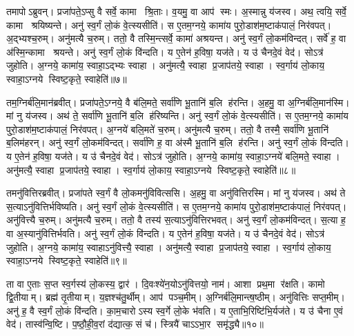    तमापोऽब्रुवन्।
   प्रजा॑पते॒ऽप्सु वै सर्वे॒ कामा श्रि॒ताः।
   व॒यमु॒ वा आप॑ स्मः।
   अ॒स्मान्नु य॑जस्व।
   अथ॒ त्वयि॒ सर्वे॒ कामा श्रयिष्यन्ते।
   अनु॑ स्व॒र्गं लो॒कं वे॒त्स्यसीति॑।
   स ए॒तम॒ग्नये॒ कामा॑य पुरो॒डाश॑म॒ष्टाक॑पालं॒ निर॑वपत्।
   अ॒द्भ्यश्च॒रुम्।
   अनु॑मत्यै च॒रुम्।
   ततो॒ वै तस्मि॒न्त्सर्वे॒ कामा॑ अश्रयन्त।
   अनु॑ स्व॒र्गं लो॒कम॑विन्दत्।
   सर्वे॑ ह॒ वा अ॑स्मि॒न्कामा श्रयन्ते।
   अनु॑ स्व॒र्गं लो॒कं वि॑न्दति।
   य ए॒तेन॑ ह॒विषा॒ यज॑ते।
   य उ॑ चैनदे॒वं वेद॑।
   सोऽत्र॑ जुहोति।
   अ॒ग्नये॒ कामा॑य॒ स्वाहा॒ऽद्भ्यः स्वाहा।
   अनु॑मत्यै॒ स्वाहा प्र॒जाप॑तये॒ स्वाहा।
   स्व॒र्गाय॑ लो॒काय॒ स्वाहा॒ऽग्नये स्विष्ट॒कृते॒ स्वाहेति॑॥७॥

   तम॒ग्निर्ब॑लि॒मान॑ब्रवीत्।
   प्रजा॑पते॒ऽग्नये॒ वै ब॑लि॒मते॒ सर्वा॑णि भू॒तानि॑ ब॒लि ह॑रन्ति।
   अ॒हमु॒ वा अ॒ग्निर्ब॑लि॒मान॑स्मि।
   मां नु य॑जस्व।
   अथ॑ ते॒ सर्वा॑णि भू॒तानि॑ ब॒लि ह॑रिष्यन्ति।
   अनु॑ स्व॒र्गं लो॒कं वे॒त्स्यसीति॑।
   स ए॒तम॒ग्नये॒ कामा॑य पुरो॒डाश॑म॒ष्टाक॑पालं॒ निर॑वपत्।
   अ॒ग्नये॑ बलि॒मते॑ च॒रुम्।
   अनु॑मत्यै च॒रुम्।
   ततो॒ वै तस्मै॒ सर्वा॑णि भू॒तानि॑ ब॒लिम॑हरन्।
   अनु॑ स्व॒र्गं लो॒कम॑विन्दत्।
   सर्वा॑णि ह॒ वा अ॑स्मै भू॒तानि॑ ब॒लि ह॑रन्ति।
   अनु॑ स्व॒र्गं लो॒कं वि॑न्दति।
   य ए॒तेन॑ ह॒विषा॒ यज॑ते।
   य उ॑ चैनदे॒वं वेद॑।
   सोऽत्र॑ जुहोति।
   अ॒ग्नये॒ कामा॑य॒ स्वाहा॒ऽग्नये॑ बलि॒मते॒ स्वाहा।
   अनु॑मत्यै॒ स्वाहा प्र॒जाप॑तये॒ स्वाहा।
   स्व॒र्गाय॑ लो॒काय॒ स्वाहा॒ऽग्नये स्विष्ट॒कृते॒ स्वाहेति॑॥८॥

   तमनु॑वित्तिरब्रवीत्।
   प्रजा॑पते स्व॒र्गं वै लो॒कमनु॑विवित्ससि।
   अ॒हमु॒ वा अनु॑वित्तिरस्मि।
   मां नु य॑जस्व।
   अथ॑ ते स॒त्याऽनु॑वित्तिर्भविष्यति।
   अनु॑ स्व॒र्गं लो॒कं वे॒त्स्यसीति॑।
   स ए॒तम॒ग्नये॒ कामा॑य पुरो॒डाश॑म॒ष्टाक॑पालं॒ निर॑वपत्।
   अनु॑वित्त्यै च॒रुम्।
   अनु॑मत्यै च॒रुम्।
   ततो॒ वै तस्य॑ स॒त्याऽनु॑वित्तिरभवत्।
   अनु॑ स्व॒र्गं लो॒कम॑विन्दत्।
   स॒त्या ह॒ वा अ॒स्यानु॑वित्तिर्भवति।
   अनु॑ स्व॒र्गं लो॒कं वि॑न्दति।
   य ए॒तेन॑ ह॒विषा॒ यज॑ते।
   य उ॑ चैनदे॒वं वेद॑।
   सोऽत्र॑ जुहोति।
   अ॒ग्नये॒ कामा॑य॒ स्वाहाऽनु॑वित्त्यै॒ स्वाहा।
   अनु॑मत्यै॒ स्वाहा प्र॒जाप॑तये॒ स्वाहा।
   स्व॒र्गाय॑ लो॒काय॒ स्वाहा॒ऽग्नये स्विष्ट॒कृते॒ स्वाहेति॑॥९॥

   ता वा ए॒ताः स॒प्त स्व॒र्गस्य॑ लो॒कस्य॒ द्वार॑।
   दि॒वःश्ये॑न॒योऽनु॑\-वित्तयो॒ नाम॑।
   आशा प्रथ॒मा र॑क्षति।
   कामो द्वि॒तीयाम्।
   ब्रह्म॑ तृ॒तीयाम्।
   य॒ज्ञश्च॑तु॒र्थीम्।
   आप॑ पञ्च॒मीम्।
   अ॒ग्निर्ब॑लि॒मान्त्ष॒ष्ठीम्।
   अनु॑वित्तिः सप्त॒मीम्।
   अनु॑ ह॒ वै स्व॒र्गं लो॒कं वि॑न्दति।
   का॒म॒चारोऽस्य स्व॒र्गे लो॒के भ॑वति।
   य ए॒ताभि॒रिष्टि॑भि॒र्यज॑ते।
   य उ॑ चैना ए॒वं वेद॑।
   तास्व॑न्वि॒ष्टि।
   प॒ष्ठौ॒ही॒व॒रां द॑द्यात्क॒सं च॑।
   स्त्रियै॑ चाऽऽभा॒र समृ॑द्ध्यै॥१०॥
\anuvakamend
  
